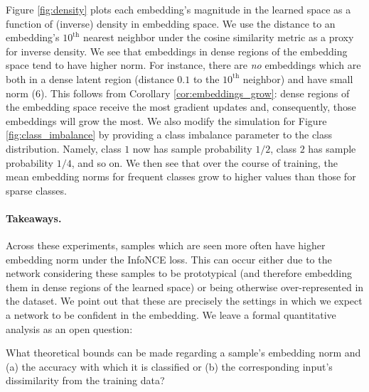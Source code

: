 Figure \ref{fig:density} plots each embedding's magnitude in the learned space as a function of (inverse) density in embedding space. We use the distance to an embedding's $10^\text{th}$ nearest neighbor under the cosine similarity metric as a proxy for inverse density. We see that embeddings in dense regions of the embedding space tend to have higher norm. For instance, there are \emph{no} embeddings which are both in a dense latent region (distance \mytexttilde$0.1$ to the $10^\text{th}$ neighbor) and have small norm (\mytexttilde$6$). This follows from Corollary \ref{cor:embeddings_grow}: dense regions of the embedding space receive the most gradient updates and, consequently, those embeddings will grow the most. We also modify the simulation for Figure \ref{fig:class_imbalance} by providing a class imbalance parameter to the class distribution. Namely, class $1$ now has sample probability \mytexttilde$1/2$, class $2$ has sample probability \mytexttilde$1/4$, and so on. We then see that over the course of training, the mean embedding norms for frequent classes grow to higher values than those for sparse classes.

\paragraph{Takeaways.} Across these experiments, samples which are seen more often have higher embedding norm under the InfoNCE loss. This can occur either due to the network considering these samples to be prototypical (and therefore embedding them in dense regions of the learned space) or being otherwise over-represented in the dataset. We point out that these are precisely the settings in which we expect a network to be confident in the embedding.  We leave a formal quantitative analysis
as an open question:

\begin{question}
    What theoretical bounds can be made regarding a sample's embedding norm and (a) the accuracy with which it is classified or (b) the corresponding input's dissimilarity from the training data?
\end{question}
